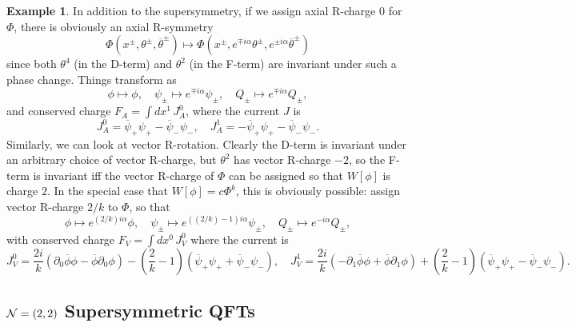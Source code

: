 \documentclass{report}
\theoremstyle{plain}
\theoremstyle{definition}
\newtheorem{example}[theorem]{Example}
\theoremstyle{remark}
\newcommand{\di}{\partial}
\newcommand{\cnj}{\overline}
\begin{document}
\begin{example}
  In addition to the supersymmetry, if we assign axial R-charge $0$
  for $\Phi$, there is obviously an axial R-symmetry
  \[ \Phi(x^\pm, \theta^\pm, \cnj\theta^\pm) \mapsto \Phi(x^\pm, e^{\mp i\alpha} \theta^\pm, e^{\pm i\alpha} \cnj\theta^\pm) \]
  since both $\theta^4$ (in the D-term) and $\theta^2$ (in the F-term)
  are invariant under such a phase change. Things transform as
  \[ \phi \mapsto \phi, \quad \psi_\pm \mapsto e^{\mp i\alpha} \psi_\pm, \quad Q_\pm \mapsto e^{\mp i\alpha} Q_\pm, \]
  and conserved charge $F_A = \int dx^1 \, J^0_A$, where the current
  $J$ is
  \[ J^0_A = \cnj\psi_+ \psi_+ - \cnj\psi_- \psi_-, \quad J^1_A = -\cnj\psi_+ \psi_+ - \cnj\psi_- \psi_-. \]
  Similarly, we can look at vector R-rotation. Clearly the D-term is
  invariant under an arbitrary choice of vector R-charge, but
  $\theta^2$ has vector R-charge $-2$, so the F-term is invariant iff
  the vector R-charge of $\Phi$ can be assigned so that $W[\phi]$ is
  charge $2$. In the special case that $W[\phi] = c\Phi^k$, this is
  obviously possible: assign vector R-charge $2/k$ to $\Phi$, so that
  \[ \phi \mapsto e^{(2/k)i\alpha}\phi, \quad \psi_\pm \mapsto e^{((2/k)-1)i\alpha} \psi_\pm, \quad Q_\pm \mapsto e^{-i\alpha} Q_\pm, \]
  with conserved charge $F_V = \int dx^0 \, J^0_V$ where the current
  is
  \[ J^0_V = \frac{2i}{k}(\di_0 \cnj\phi \phi - \cnj\phi \di_0\phi) - \left(\frac{2}{k}-1\right)(\cnj\psi_+ \psi_+ + \cnj\psi_- \psi_-), \quad J^1_V = \frac{2i}{k}(-\di_1 \cnj\phi \phi + \cnj\phi \di_1\phi) + \left(\frac{2}{k}-1\right)(\cnj\psi_+ \psi_+ - \cnj\psi_- \psi_-). \]
\end{example}

\subsection{\texorpdfstring{${\cal N} = (2,2)$}{N = (2,2)} Supersymmetric QFTs}
\end{document}
